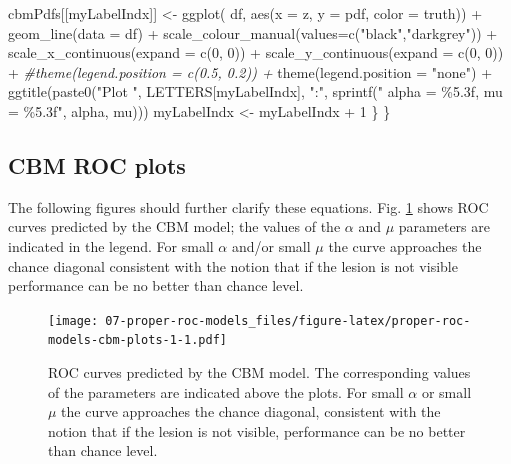 \documentclass[
]{book}
\newenvironment{Shaded}{\begin{snugshade}}{\end{snugshade}}
\newcommand{\AttributeTok}[1]{\textcolor[rgb]{0.77,0.63,0.00}{#1}}
\newcommand{\CommentTok}[1]{\textcolor[rgb]{0.56,0.35,0.01}{\textit{#1}}}
\newcommand{\DecValTok}[1]{\textcolor[rgb]{0.00,0.00,0.81}{#1}}
\newcommand{\FunctionTok}[1]{\textcolor[rgb]{0.00,0.00,0.00}{#1}}
\newcommand{\NormalTok}[1]{#1}
\newcommand{\OtherTok}[1]{\textcolor[rgb]{0.56,0.35,0.01}{#1}}
\newcommand{\SpecialCharTok}[1]{\textcolor[rgb]{0.00,0.00,0.00}{#1}}
\newcommand{\StringTok}[1]{\textcolor[rgb]{0.31,0.60,0.02}{#1}}
\begin{document}
\begin{Shaded}
\begin{Highlighting}[]
\NormalTok{      cbmPdfs[[myLabelIndx]] }\OtherTok{\textless{}{-}} \FunctionTok{ggplot}\NormalTok{(}
\NormalTok{        df, }\FunctionTok{aes}\NormalTok{(}\AttributeTok{x =}\NormalTok{ z, }\AttributeTok{y =}\NormalTok{ pdf, }\AttributeTok{color =}\NormalTok{ truth)) }\SpecialCharTok{+}
        \FunctionTok{geom\_line}\NormalTok{(}\AttributeTok{data =}\NormalTok{ df) }\SpecialCharTok{+}
        \FunctionTok{scale\_colour\_manual}\NormalTok{(}\AttributeTok{values=}\FunctionTok{c}\NormalTok{(}\StringTok{"black"}\NormalTok{,}\StringTok{"darkgrey"}\NormalTok{)) }\SpecialCharTok{+}
        \FunctionTok{scale\_x\_continuous}\NormalTok{(}\AttributeTok{expand =} \FunctionTok{c}\NormalTok{(}\DecValTok{0}\NormalTok{, }\DecValTok{0}\NormalTok{)) }\SpecialCharTok{+}
        \FunctionTok{scale\_y\_continuous}\NormalTok{(}\AttributeTok{expand =} \FunctionTok{c}\NormalTok{(}\DecValTok{0}\NormalTok{, }\DecValTok{0}\NormalTok{)) }\SpecialCharTok{+}
        \CommentTok{\#theme(legend.position = c(0.5, 0.2)) +}
        \FunctionTok{theme}\NormalTok{(}\AttributeTok{legend.position =} \StringTok{"none"}\NormalTok{) }\SpecialCharTok{+}
        \FunctionTok{ggtitle}\NormalTok{(}\FunctionTok{paste0}\NormalTok{(}\StringTok{"Plot "}\NormalTok{, }
\NormalTok{                   LETTERS[myLabelIndx], }
                   \StringTok{":"}\NormalTok{, }
                   \FunctionTok{sprintf}\NormalTok{(}\StringTok{" alpha = \%5.3f, mu = \%5.3f"}\NormalTok{, }
\NormalTok{                           alpha, mu)))}
\NormalTok{      myLabelIndx }\OtherTok{\textless{}{-}}\NormalTok{ myLabelIndx }\SpecialCharTok{+} \DecValTok{1}
\NormalTok{    \}}
\NormalTok{  \}}
\end{Highlighting}
\end{Shaded}

\hypertarget{proper-roc-models-cbm-rocs}{%
\subsection{CBM ROC plots}\label{proper-roc-models-cbm-rocs}}

The following figures should further clarify these equations. Fig. \ref{fig:proper-roc-models-cbm-plots-1} shows ROC curves predicted by the CBM model; the values of the \(\alpha\) and \(\mu\) parameters are indicated in the legend. For small \(\alpha\) and/or small \(\mu\) the curve approaches the chance diagonal consistent with the notion that if the lesion is not visible performance can be no better than chance level.

\begin{figure}
\centering
\texttt{[image: 07-proper-roc-models\_files/figure-latex/proper-roc-models-cbm-plots-1-1.pdf]}
\caption{\label{fig:proper-roc-models-cbm-plots-1}ROC curves predicted by the CBM model. The corresponding values of the parameters are indicated above the plots. For small \(\alpha\) or small \(\mu\) the curve approaches the chance diagonal, consistent with the notion that if the lesion is not visible, performance can be no better than chance level.}
\end{figure}
\end{document}
